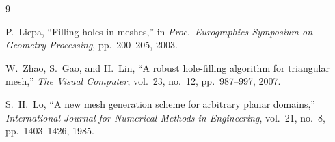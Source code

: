 \documentclass[12pt,a4paper]{article}
\begin{document}
\begin{thebibliography}{9}

P.~Liepa, ``Filling holes in meshes,'' in \textit{Proc.\ Eurographics Symposium on Geometry Processing}, pp.~200--205, 2003.

W.~Zhao, S.~Gao, and H.~Lin, ``A robust hole-filling algorithm for triangular mesh,'' \textit{The Visual Computer}, vol.~23, no.~12, pp.~987--997, 2007.

S.~H.~Lo, ``A new mesh generation scheme for arbitrary planar domains,'' \textit{International Journal for Numerical Methods in Engineering}, vol.~21, no.~8, pp.~1403--1426, 1985.

\end{thebibliography}
\end{document}
